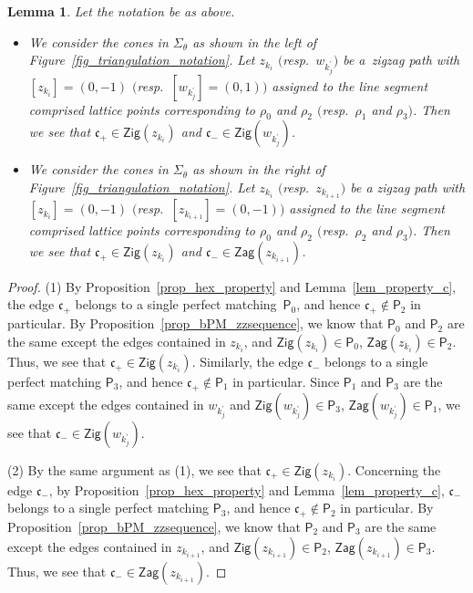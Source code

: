 \documentclass[pdftex]{sigma}
\numberwithin{equation}{section}
\newtheorem{Lemma}[Theorem]{Lemma}
\theoremstyle{definition}
\newcommand{\fkc}{\mathfrak{c}}
\newcommand{\sfP}{\mathsf{P}}
\newcommand{\Zig}{\mathsf{Zig}}
\newcommand{\Zag}{\mathsf{Zag}}
\begin{document}
\begin{Lemma}\label{lem_zigzag_containPM}
Let the notation be as above.
\begin{itemize}\itemsep=0pt
\item[$(1)$] We consider the cones in $\Sigma_\theta$ as shown in the left of {\rm Figure~\ref{fig_triangulation_notation}}.
Let $z_{k_i}$ $($resp.\ $w_{k^\prime_j})$ be a~zigzag path with $[z_{k_i}]=(0,-1)$ $($resp.\ $[w_{k^\prime_j}]=(0,1))$ assigned to the line segment comprised lattice points
corresponding to $\rho_0$ and $\rho_2$ $($resp.\ $\rho_1$ and $\rho_3)$.
Then we see that $\fkc_+\in\Zig(z_{k_i})$ and $\fkc_-\in \Zig(w_{k^\prime_j})$.
\item[$(2)$] We consider the cones in $\Sigma_\theta$ as shown in the right of {\rm Figure~\ref{fig_triangulation_notation}}.
Let $z_{k_i}$ $($resp.\ $z_{k_{i+1}})$ be a zigzag path with $[z_{k_i}]=(0,-1)$ $($resp.\ $[z_{k_{i+1}}]=(0,-1))$ assigned to the line segment comprised lattice points
corresponding to $\rho_0$ and $\rho_2$ $($resp.\ $\rho_2$ and $\rho_3)$.
Then we see that $\fkc_+\in\Zig(z_{k_i})$ and $\fkc_-\in \Zag(z_{k_{i+1}})$.
\end{itemize}
\end{Lemma}

\begin{proof} (1)
By Proposition~\ref{prop_hex_property} and Lemma~\ref{lem_property_c}, the edge $\fkc_+$ belongs to a single perfect matching~$\sfP_0$,
and hence $\fkc_+\not\in\sfP_2$ in particular.
By Proposition~\ref{prop_bPM_zzsequence}, we know that $\sfP_0$ and $\sfP_2$ are the same except the edges contained in $z_{k_i}$,
and $\Zig(z_{k_i})\in\sfP_0$, $\Zag(z_{k_i})\in\sfP_2$.
Thus, we see that $\fkc_+\in\Zig(z_{k_i})$.
Similarly, the edge $\fkc_-$ belongs to a single perfect matching $\sfP_3$, and hence $\fkc_+\not\in\sfP_1$ in particular.
Since $\sfP_1$ and $\sfP_3$ are the same except the edges contained in $w_{k^\prime_j}$
and $\Zig(w_{k^\prime_j})\in\sfP_3$, $\Zag(w_{k^\prime_j})\in\sfP_1$, we see that $\fkc_-\in \Zig(w_{k^\prime_j})$.

(2) By the same argument as (1), we see that $\fkc_+\in\Zig(z_{k_i})$.
Concerning the edge $\fkc_-$, by Proposition~\ref{prop_hex_property} and Lemma~\ref{lem_property_c},
$\fkc_-$ belongs to a single perfect matching $\sfP_3$, and hence $\fkc_+\not\in\sfP_2$ in particular.
By Proposition~\ref{prop_bPM_zzsequence}, we know that $\sfP_2$ and $\sfP_3$ are the same except the edges contained in $z_{k_{i+1}}$,
and $\Zig(z_{k_{i+1}})\in\sfP_2$, $\Zag(z_{k_{i+1}})\in\sfP_3$.
Thus, we see that $\fkc_-\in\Zag(z_{k_{i+1}})$.
\end{proof}
\end{document}

